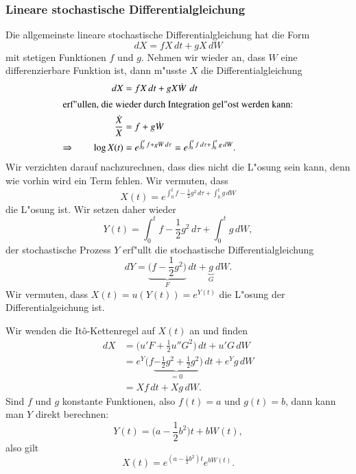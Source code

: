 \subsubsection{Lineare stochastische Differentialgleichung}
Die allgemeinste lineare stochastische Differentialgleichung hat die Form
\begin{equation}
dX=fX\,dt+gX\,dW
\label{stochastisch:beispiel2-dgl}
\end{equation}
mit stetigen Funktionen $f$ und $g$.
Nehmen wir wieder an, dass $W$ eine differenzierbare Funktion ist,
dann m"usste $X$ die Differentialgleichung
\begin{align*}
dX&=fX\,dt + gX\dot W\,\,dt
\\
\intertext{erf"ullen, die wieder durch Integration gel"ost werden kann:}
\frac{\dot X}{X}
&=
f+g\dot W
\\
\Rightarrow\qquad
\log X(t)
&=
e^{\int_0^t f+g\dot W\,d\tau}
=
e^{\int_0^t f\,d\tau+ \int_0^t g\,dW}.
\end{align*}
Wir verzichten darauf nachzurechnen, dass dies nicht die L"osung sein kann,
denn wie vorhin wird ein Term fehlen.
Wir vermuten, dass
\begin{equation}
X(t)
=
e^{\int_0^t f -\frac12g^2\,d\tau + \int_0^t g\,dW}
\label{stochastisch:beispiel2-lsg}
\end{equation}
die L"osung ist.
Wir setzen daher wieder
\[
Y(t)=\int_0^t f-\frac12g^2\,d\tau + \int_0^tg\,dW,
\]
der stochastische Prozess $Y$ erf"ullt die stochastische Differentialgleichung
\[
dY=
\underbrace{\biggl( f-\frac12g^2\biggr)}_{\textstyle F}\,dt
+
\underbrace{g}_{\textstyle G}\,dW.
\]
Wir vermuten, dass $X(t)=u(Y(t))=e^{Y(t)}$ die L"osung der
Differentialgeichung ist.

Wir wenden die It\^o-Kettenregel auf $X(t)$ an und finden
\begin{align*}
dX
&=
\biggl(u'F+\frac12u''G^2\biggr)\,dt + u'G\,dW
\\
&=
e^Y\biggl( f\underbrace{-\frac12g^2+\frac12 g^2}_{\textstyle=0}\biggr)\,dt
+
e^Yg\,dW
\\
&=
Xf\,dt + Xg\,dW.
\end{align*}
Sind $f$ und $g$ konstante Funktionen, also $f(t)=a$ und $g(t)=b$, dann
kann man $Y$ direkt berechnen:
\[
Y(t)=\biggl(a-\frac12b^2\biggr)t + bW(t),
\]
also gilt
\[
X(t)=e^{(a-\frac12b^2)t} e^{bW(t)}.
\]

